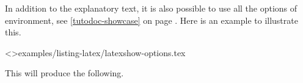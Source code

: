 \documentclass{tutodoc}
\begin{document}
\begin{tdocexa}
    In addition to the explanatory text, it is also possible to use all the options of  environment, see \ref{tutodoc-showcase} on page \pageref{tutodoc-showcase}.
    Here is an example to illustrate this.

    \medskip

    \tdoclatexinput<>{examples/listing-latex/latexshow-options.tex}

    \medskip

    This will produce the following.

    \medskip

    \begin{tdocshowcaseDOC}
        
    \end{tdocshowcaseDOC}
\end{tdocexa}
\end{document}
